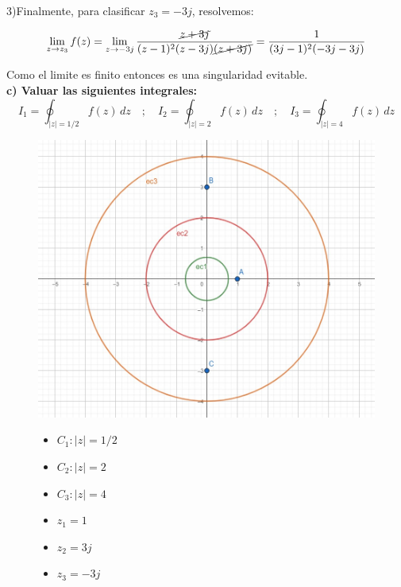 \documentclass[12pt,a4paper]{report}
\begin{document}
3)Finalmente, para clasificar $z_3=-3j$, resolvemos:

$$\lim_{z \to z_3}f(z)=\lim_{z \to -3j}\frac{\cancel{z+3j}}{(z - 1)^2(z-3j)\cancel{(z+3j)}}=\frac{1}{(3j-1)^2(-3j-3j)}$$

Como el limite es finito entonces es una singularidad evitable.\\

\textbf{c) Valuar las siguientes integrales:}\\[6pt]
$$
I_1 = \oint_{|z|=1/2} f(z) \, dz\quad;\quad
I_2 = \oint_{|z|=2} f(z) \, dz\quad;\quad
I_3 = \oint_{|z|=4} f(z) \, dz
$$

\begin{figure}[h]
    \centering
    \begin{minipage}{0.65\textwidth}
        \centering
        \includegraphics[width=\textwidth]{./Imagenes/foto1Ej5.jpeg}
    \end{minipage}\hfill
    \begin{minipage}{0.35\textwidth}
        \centering
        \begin{itemize}
            \item $C_1:|z|=1/2$
            \item $C_2:|z|=2$
            \item $C_3:|z|=4$
            \item $z_1=1$
            \item $z_2=3j$
            \item $z_3=-3j$
        \end{itemize}
    \end{minipage}
\end{figure}
\end{document}
